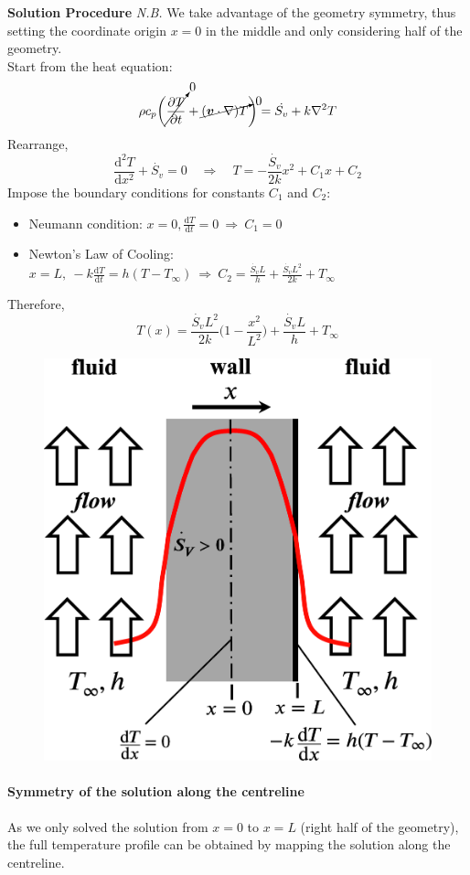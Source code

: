 \documentclass[12pt, a4paper]{article}
\begin{document}
\begin{tcolorbox}[breakable, title = \textbf{Example: Internal Heat Generation}]
\textbf{Solution Procedure} \quad 
\emph{N.B.} We take advantage of the geometry symmetry, thus setting the coordinate origin $x=0$ in the middle and only considering half of the geometry. \\
Start from the heat equation:
\[ 
    \rho c_{p} \bigg( \cancelto{0}{\frac{\partial T}{\partial t}} +\cancelto{0}{(\bm{v} \cdot \nabla) T} \bigg) = \dot{S_{v}}  +k \nabla^{2} T 
\]
Rearrange,
\[ 
    \frac{\mathrm{d}^{2} T}{\mathrm{d}x^{2}} + \dot{S_{v}}=0 \quad \Rightarrow \quad T = -\frac{\dot{S_{v}}}{2k}x^{2}+C_{1}x + C_{2}
\]
Impose the boundary conditions for constants $C_1$ and $C_2$:
\begin{itemize}
    \item Neumann condition: $\displaystyle x=0, \frac{\mathrm{d}T}{\mathrm{d}t}=0 \ \Rightarrow \  C_{1}=0$
    \item Newton's Law of Cooling: $\displaystyle x=L, \ -k\frac{\mathrm{d}T}{\mathrm{d}t}=h(T-T_{\infty}) \ \Rightarrow \ C_{2}=\frac{\dot{S_{v}}L}{h}+\frac{\dot{S_{v}}L^{2}}{2k}+T_{\infty}$ 
\end{itemize}
Therefore,
\[
    T(x) = \frac{\dot{S_{v}}L^{2}}{2k} \bigg( 1-\frac{x^{2}}{L^{2}} \bigg) + \frac{\dot{S_{v}}L}{h} + T_{\infty} 
\]
\begin{figure}[H]
    \centering
    \includegraphics[width=.4\textwidth]{img/internal_heat_gen_solution.eps}
\end{figure}
\paragraph{Symmetry of the solution along the centreline} As we only solved the solution from $x=0$ to $x=L$ (right half of the geometry), the full temperature profile can be obtained by mapping the solution along the centreline.
\end{tcolorbox}
\end{document}
